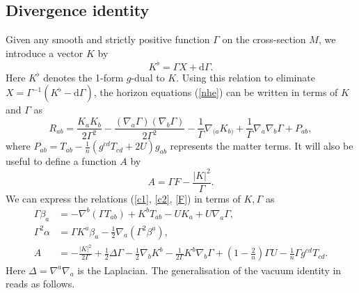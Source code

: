 \documentclass[11pt, reqno]{amsart}
\theoremstyle{plain}
\theoremstyle{definition}
\numberwithin{equation}{section}
\begin{document}
\subsection{Divergence identity}  \label{divsec} Given any smooth and strictly positive function $\Gamma$ on the cross-section $M$, we introduce a vector $K$ by
\begin{equation} \label{Kans}
    K^\flat = \Gamma X + \text{d}\Gamma.
\end{equation}
Here $K^\flat$ denotes the 1-form $g$-dual to $K$. Using this relation to eliminate $X = \Gamma^{-1}(K^\flat - \text{d}\Gamma)$, the horizon equations (\ref{nhe}) can be written in terms of $K$ and $\Gamma$ as 
\begin{equation} \label{nhek}
        R_{ab} = \frac{K_aK_b}{2\Gamma^2} - \frac{(\nabla_a\Gamma)(\nabla_b\Gamma)}{2\Gamma^2} - \frac{1}{\Gamma}\nabla_{(a}K_{b)} + \frac{1}{\Gamma}\nabla_a\nabla_b\Gamma + P_{ab},
\end{equation}
where $P_{ab} = T_{ab} - \frac 1n(g^{cd}T_{cd} + 2U)g_{ab}$ represents the matter terms. It will also be useful to define a function $A$ by 
\begin{equation} \label{A}
    A = \Gamma F - \frac{\vert K \vert^2}{\Gamma}.
\end{equation}
We can express the relations (\ref{c1}, \ref{c2}, \ref{F}) in terms of $K,\Gamma$ as 
\begin{subequations} \label{rewritek}
    \begin{align}
        \Gamma \beta_a &= -\nabla^b(\Gamma T_{ab}) + K^bT_{ab} - UK_a + U\nabla_a \Gamma, \label{beta}\\
        \Gamma^2\alpha &= \Gamma K^a\beta_a - \frac 12\nabla_a(\Gamma^2 \beta^a),\label{alpha} \\
        A &= -\frac{\vert K \vert^2}{2\Gamma} + \frac 12 \Delta \Gamma - \frac 12 \nabla_b K^b - \frac{1}{2\Gamma}K^b\nabla_b \Gamma + (1-\tfrac 2n)\Gamma U - \frac 1n\Gamma g^{cd}T_{cd}. \label{A2}
\end{align}
\end{subequations}
Here $\Delta = \nabla^a\nabla_a$ is the Laplacian. The generalisation of the vacuum identity in \cite{DL} reads as follows.
\end{document}
